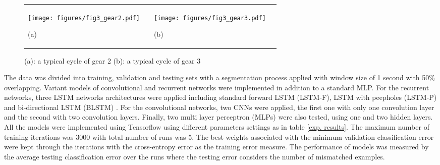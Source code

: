 \documentclass[12pt,a4paper]{article}
\begin{document}
\begin{figure}[h!]
\centering
\begin{tabular}{ p{6cm} p{1cm} p{6cm} p{1cm}}
\texttt{[image: figures/fig3\_gear2.pdf]}{\begin{center}(a)\end{center} } && \texttt{[image: figures/fig3\_gear3.pdf]}{\begin{center}(b)\end{center} }&  \\
\end{tabular}
\caption{(a): a typical cycle of gear 2 (b): a typical cycle of gear  3}
\label{examples}
\end{figure}

The data was divided into training, validation and testing sets with a segmentation process applied with window size of 1 second with 50\% overlapping. Variant models of convolutional and recurrent networks were implemented in addition to a standard MLP. For the recurrent networks, three LSTM networks architectures were applied including standard forward LSTM (LSTM-F), LSTM with peepholes (LSTM-P) and bi-directional LSTM (BLSTM) . For the convolutional networks, two CNNs were applied, the first one with only one convolution layer and the second with two convolution layers.  Finally, two multi layer perceptron (MLPs) were also tested, using one and two hidden layers. All the models were implemented using Tensorflow using different parameters settings as in table \ref{exp. results}. The maximum number of training iterations was 3000 with total number of runs was 5. The best weights associated with the minimum validation classification error were kept through the iterations with the cross-entropy error as the training error measure. The performance of models was measured by the average testing classification error over the runs where the testing error considers the number of mismatched examples.
\end{document}
